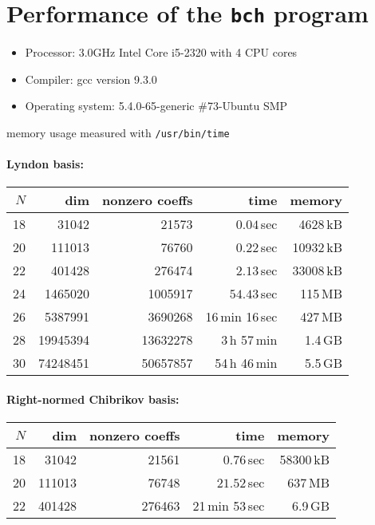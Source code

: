 \documentclass[11pt,a4paper]{article}
\begin{document}
\section{Performance of the {\tt bch} program}
\begin{itemize}
\item Processor: 3.0GHz Intel Core i5-2320 with 4 CPU cores
\item Compiler: gcc version 9.3.0
\item Operating system: 5.4.0-65-generic \#73-Ubuntu SMP
\end{itemize}

memory usage measured with \verb|/usr/bin/time|
\paragraph{Lyndon basis:}
\begin{center}
\begin{tabular}{rrrrr}
\hline
$N$ & dim & nonzero coeffs & time  & memory \\
\hline
18 &  31042 & 21573 &  $0.04$\,sec & 4628\,kB\\
20 & 111013 & 76760 & $0.22$\,sec  & 10932\,kB \\
22 & 401428 & 276474 & $2.13$\,sec & 33008\,kB \\
24 & 1465020 & 1005917 & $54.43$\,sec  & 115\,MB\\
26 & 5387991 & 3690268 & 16\,min 16\,sec  &  427\,MB\\
28 & 19945394 & 13632278 & 3\,h 57\,min & 1.4\,GB\\
30 & 74248451 & 50657857 & 54\,h 46\,min & 5.5\,GB\\
\hline
\end{tabular}
\end{center}

\paragraph{Right-normed Chibrikov basis:}
\begin{center}
\begin{tabular}{rrrrr}
\hline
$N$ & dim & nonzero coeffs & time  & memory \\
\hline
18 & 31042  & 21561 & $0.76$\,sec & 58300\,kB \\
20 & 111013 & 76748 & $21.52$\,sec & 637\,MB \\
22 & 401428 & 276463 & 21\,min 53\,sec & 6.9\,GB\\
\hline
\end{tabular}
\end{center}
\end{document}

